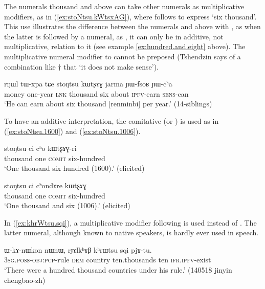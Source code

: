The numerals thousand and above can take other numerals as multiplicative modifiers, as in (\ref{ex:stoNtsu.kWtsxAG}), where  follows   to express `six thousand'. This use illustrates the difference between the numerals  and above with , as when the latter is followed by a numeral, as , it can only be in additive, not multiplicative, relation to it (see example \ref{ex:hundred.and.eight} above). The multiplicative numeral modifier to  cannot be preposed (Tshendzin says of a combination like $\dagger$ that  `it does not make sense').

\begin{exe}
\ex  \label{ex:stoNtsu.kWtsxAG}
 \gll   rŋɯl tɯ-xpa tɕe stoŋtsu kɯtʂɤɣ jarma ɲɯ-fsoʁ ɲɯ-cʰa \\
 money one-year \textsc{lnk} thousand six about \textsc{ipfv}-earn \textsc{sens}-can \\
 \glt `He can earn about six thousand [renminbi] per year.' (14-siblings) 
\end{exe}
  
 To have an additive interpretation, the comitative  (or ) is used as in (\ref{ex:stoNtsu.1600}) and (\ref{ex:stoNtsu.1006}).
 
\begin{exe}
\ex  \label{ex:stoNtsu.1600}
\gll  stoŋtsu ci cʰo kɯtʂɤɣ-ri \\
 thousand one \textsc{comit} six-hundred \\
\glt `One thousand six hundred (1600).' (elicited)
\end{exe}
  
\begin{exe}
\ex  \label{ex:stoNtsu.1006}
\gll  stoŋtsu ci cʰondɤre kɯtʂɤɣ \\
 thousand one \textsc{comit} six-hundred \\
\glt `One thousand and six (1006).' (elicited)
\end{exe}

In (\ref{ex:khrWtsu.sqi}), a multiplicative modifier  following  is used instead of . The latter numeral, although known to native speakers, is hardly ever used in speech.

\begin{exe}
\ex  \label{ex:khrWtsu.sqi}
\gll ɯ-kɤ-nɯkon nɯnɯ, rɟɤlkʰɤβ kʰrɯtsu sqi pjɤ-tu. \\
 \textsc{3sg}.\textsc{poss}-\textsc{obj}:\textsc{pcp}-rule \textsc{dem} country ten.thousands ten \textsc{ifr}.\textsc{ipfv}-exist \\
\glt `There were a hundred thousand countries under his rule.' (140518 jinyin chengbao-zh) 
\end{exe} 


